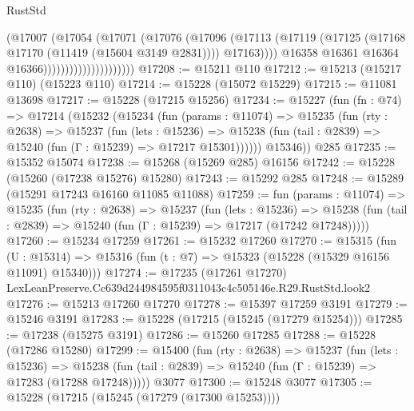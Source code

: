 \begin{lexlean}{RustStd}
\begin{coremodule}
                                        (@17007
                                          (@17054
                                            (@17071
                                              (@17076
                                                (@17096
                                                  (@17113
                                                    (@17119
                                                      (@17125
                                                        (@17168
                                                          @17170
                                                          (@11419 (@15604 @3149 @2831))))
                                                      @17163))))
                                              @16358
                                              @16361
                                              @16364
                                              @16366)))))))))))))))))))))
@17208 := @15211 @110
@17212 := @15213 (@15217 @110) (@15223 @110)
@17214 := @15228 (@15072 @15229)
@17215 := @11081 @13698
@17217 := @15228 (@17215 @15256)
@17234 := @15227
    (fun (fn : @74) =>
    @17214
      (@15232
        (@15234
          (fun (params : @11074) =>
          @15235
            (fun (rty : @2638) =>
            @15237
              (fun (lets : @15236) =>
              @15238 (fun (tail : @2839) => @15240 (fun (Γ : @15239) => @17217 @15301))))))
        @15346))
    @285
@17235 := @15352 @15074
@17238 := @15268 (@15269 @285) @16156
@17242 := @15228 (@15260 (@17238 @15276) @15280)
@17243 := @15292 @285
@17248 := @15289 (@15291 @17243 @16160 @11085 @11088)
@17259 := fun (params : @11074) =>
  @15235
    (fun (rty : @2638) =>
    @15237
      (fun (lets : @15236) =>
      @15238 (fun (tail : @2839) => @15240 (fun (Γ : @15239) => @17217 (@17242 @17248)))))
@17260 := @15234 @17259
@17261 := @15232 @17260
@17270 := @15315
    (fun (U : @15314) => @15316 (fun (t : @7) => @15323 (@15228 (@15329 @16156 @11091) @15340)))
@17274 := @17235 (@17261 @17270) LexLeanPreserve.Cc639d244984595f0311043c4c505146e.R29.RustStd.look2
@17276 := @15213 @17260 @17270
@17278 := @15397 @17259 @3191
@17279 := @15246 @3191
@17283 := @15228 (@17215 (@15245 (@17279 @15254)))
@17285 := @17238 (@15275 @3191)
@17286 := @15260 @17285
@17288 := @15228 (@17286 @15280)
@17299 := @15400
    (fun (rty : @2638) =>
    @15237
      (fun (lets : @15236) =>
      @15238 (fun (tail : @2839) => @15240 (fun (Γ : @15239) => @17283 (@17288 @17248)))))
    @3077
@17300 := @15248 @3077
@17305 := @15228 (@17215 (@15245 (@17279 (@17300 @15253))))

\end{coremodule}
\end{lexlean}

